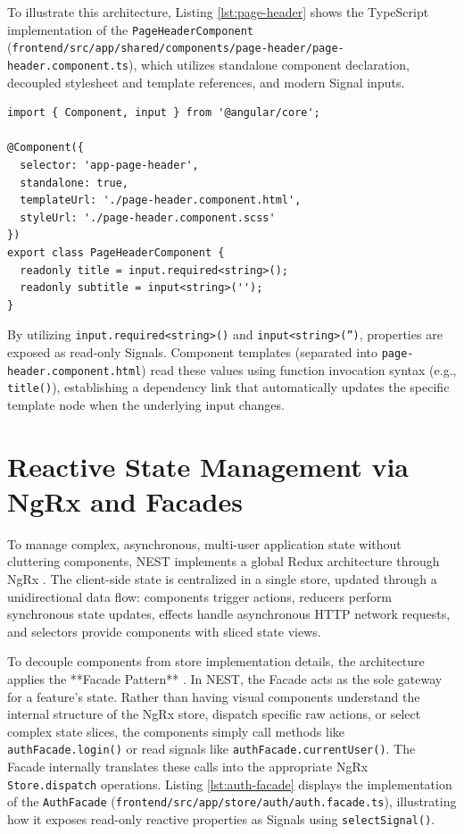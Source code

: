 To illustrate this architecture, Listing \ref{lst:page-header} shows the TypeScript implementation of the \texttt{PageHeaderComponent} (\texttt{frontend/src/app/shared/components/page-header/page-header.component.ts}), which utilizes standalone component declaration, decoupled stylesheet and template references, and modern Signal inputs.

\begin{lstlisting}[caption={Page Header Component with Separated TS Controller}, label={lst:page-header}]
import { Component, input } from '@angular/core';

@Component({
  selector: 'app-page-header',
  standalone: true,
  templateUrl: './page-header.component.html',
  styleUrl: './page-header.component.scss'
})
export class PageHeaderComponent {
  readonly title = input.required<string>();
  readonly subtitle = input<string>('');
}
\end{lstlisting}

By utilizing \texttt{input.required<string>()} and \texttt{input<string>('')}, properties are exposed as read-only Signals. Component templates (separated into \texttt{page-header.component.html}) read these values using function invocation syntax (e.g., \texttt{title()}), establishing a dependency link that automatically updates the specific template node when the underlying input changes.

\section{Reactive State Management via NgRx and Facades}
To manage complex, asynchronous, multi-user application state without cluttering components, NEST implements a global Redux architecture through NgRx \cite{ngrxDocs}. The client-side state is centralized in a single store, updated through a unidirectional data flow: components trigger actions, reducers perform synchronous state updates, effects handle asynchronous HTTP network requests, and selectors provide components with sliced state views.

To decouple components from store implementation details, the architecture applies the **Facade Pattern** \cite{gamma1994design}. In NEST, the Facade acts as the sole gateway for a feature's state. Rather than having visual components understand the internal structure of the NgRx store, dispatch specific raw actions, or select complex state slices, the components simply call methods like \texttt{authFacade.login()} or read signals like \texttt{authFacade.currentUser()}. The Facade internally translates these calls into the appropriate NgRx \texttt{Store.dispatch} operations. Listing \ref{lst:auth-facade} displays the implementation of the \texttt{AuthFacade} (\texttt{frontend/src/app/store/auth/auth.facade.ts}), illustrating how it exposes read-only reactive properties as Signals using \texttt{selectSignal()}.

